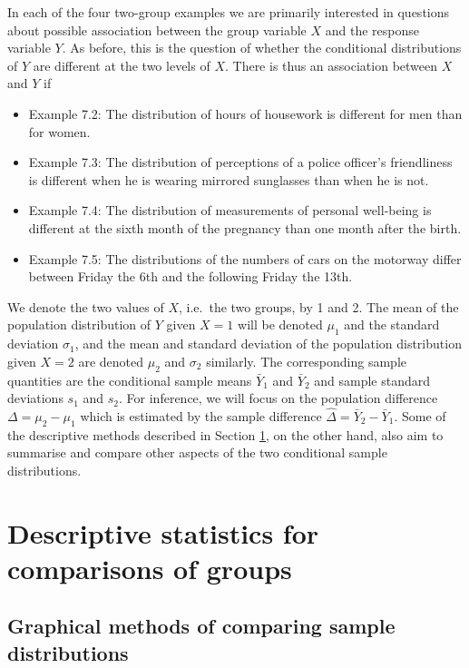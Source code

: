 \documentclass[11pt,a4paper,openany]{book}
\begin{document}
In each of the four two-group examples we are primarily interested in
questions about possible association between the group variable \(X\)
and the response variable \(Y\). As before, this is the question of
whether the conditional distributions of \(Y\) are different at the two
levels of \(X\). There is thus an association between \(X\) and \(Y\) if

\begin{itemize}
\item
  Example 7.2: The distribution of hours of housework is different for
  men than for women.
\item
  Example 7.3: The distribution of perceptions of a police officer's
  friendliness is different when he is wearing mirrored sunglasses than
  when he is not.
\item
  Example 7.4: The distribution of measurements of personal well-being
  is different at the sixth month of the pregnancy than one month after
  the birth.
\item
  Example 7.5: The distributions of the numbers of cars on the motorway
  differ between Friday the 6th and the following Friday the 13th.
\end{itemize}

We denote the two values of \(X\), i.e.~the two groups, by 1 and 2. The
mean of the population distribution of \(Y\) given \(X=1\) will be
denoted \(\mu_{1}\) and the standard deviation \(\sigma_{1}\), and the
mean and standard deviation of the population distribution given \(X=2\)
are denoted \(\mu_{2}\) and \(\sigma_{2}\) similarly. The corresponding
sample quantities are the conditional sample means \(\bar{Y}_{1}\) and
\(\bar{Y}_{2}\) and sample standard deviations \(s_{1}\) and \(s_{2}\).
For inference, we will focus on the population difference
\(\Delta=\mu_{2}-\mu_{1}\) which is estimated by the sample difference
\(\hat{\Delta}=\bar{Y}_{2}-\bar{Y}_{1}\). Some of the descriptive
methods described in Section \ref{s-means-descr}, on the other hand,
also aim to summarise and compare other aspects of the two conditional
sample distributions.

\section{Descriptive statistics for comparisons of
groups}\label{s-means-descr}

\subsection{Graphical methods of comparing sample
distributions}\label{ss-means-descr-graphs}
\end{document}
